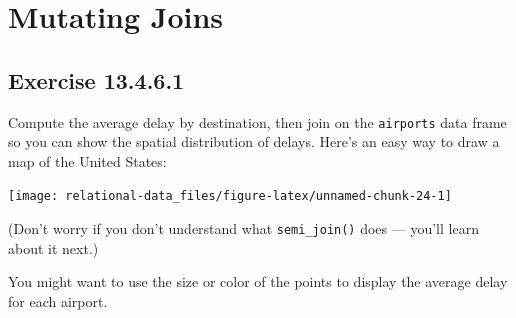 \documentclass[]{book}
\newenvironment{Shaded}{\begin{snugshade}}{\end{snugshade}}
\newcommand{\KeywordTok}[1]{\textcolor[rgb]{0.13,0.29,0.53}{\textbf{#1}}}
\newcommand{\NormalTok}[1]{#1}
\newcommand{\OperatorTok}[1]{\textcolor[rgb]{0.81,0.36,0.00}{\textbf{#1}}}
\newcommand{\StringTok}[1]{\textcolor[rgb]{0.31,0.60,0.02}{#1}}
\theoremstyle{plain}
\theoremstyle{remark}
\begin{document}
\hypertarget{mutating-joins}{%
\section{Mutating Joins}\label{mutating-joins}}

\begin{Shaded}
\end{Shaded}

\hypertarget{exercise-13.4.6.1}{%
\subsection*{\texorpdfstring{Exercise {13.4.6.1}}{Exercise 13.4.6.1}}\label{exercise-13.4.6.1}}

Compute the average delay by destination, then join on the \texttt{airports} data frame so you can show the spatial distribution of delays. Here's an easy way to draw a map of the United States:

\begin{Shaded}
\end{Shaded}

\begin{center}\texttt{[image: relational-data\_files/figure-latex/unnamed-chunk-24-1]} \end{center}

(Don't worry if you don't understand what \texttt{semi\_join()} does --- you'll learn about it next.)

You might want to use the size or color of the points to display the average delay for each airport.
\end{document}
